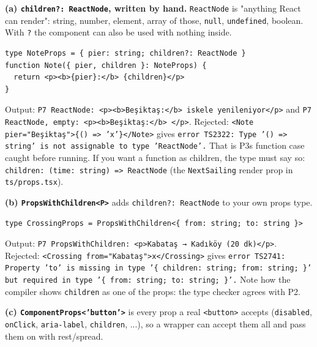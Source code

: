 \documentclass[
  10pt,
]{article}
\begin{document}
\textbf{(a) \texttt{children?:\allowbreak{} ReactNode}, written by
hand.} \texttt{ReactNode} is "anything React can render": string,
number, element, array of those, \texttt{null}, \texttt{undefined},
boolean. With \texttt{?} the component can also be used with nothing
inside.

\begin{verbatim}
type NoteProps = { pier: string; children?: ReactNode }
function Note({ pier, children }: NoteProps) {
  return <p><b>{pier}:</b> {children}</p>
}
\end{verbatim}

Output:
\texttt{P7 ReactNode:\allowbreak{} <p><b>Beşiktaş:\allowbreak{}</\allowbreak{}b> iskele yenileniyor</\allowbreak{}p>}
and
\texttt{P7 ReactNode,\allowbreak{} empty:\allowbreak{} <p><b>Beşiktaş:\allowbreak{}</\allowbreak{}b> </\allowbreak{}p>}.
Rejected:
\texttt{<Note pier=\allowbreak{}"Beşiktaş">\{(\allowbreak{}) =\allowbreak{}> 'x'\}</\allowbreak{}Note>}
gives
\texttt{error TS2322:\allowbreak{} Type '(\allowbreak{}) =\allowbreak{}> string' is not assignable to type 'ReactNode'.\allowbreak{}}
That is P3\textquotesingle s function case caught before running. If you
want a function as children, the type must say so:
\texttt{children:\allowbreak{} (\allowbreak{}time:\allowbreak{} string) =\allowbreak{}> ReactNode}
(the \texttt{NextSailing} render prop in
\texttt{ts/\allowbreak{}props.\allowbreak{}tsx}).

\textbf{(b) \texttt{PropsWithChildren<P>}} adds
\texttt{children?:\allowbreak{} ReactNode} to your own props type.

\begin{verbatim}
type CrossingProps = PropsWithChildren<{ from: string; to: string }>
\end{verbatim}

Output:
\texttt{P7 PropsWithChildren:\allowbreak{} <p>Kabataş → Kadıköy (\allowbreak{}20 dk)</\allowbreak{}p>}.
Rejected:
\texttt{<Crossing from=\allowbreak{}"Kabataş">x</\allowbreak{}Crossing>}
gives
\texttt{error TS2741:\allowbreak{} Property 'to' is missing in type '\{ children:\allowbreak{} string; from:\allowbreak{} string; \}' but required in type '\{ from:\allowbreak{} string; to:\allowbreak{} string; \}'.\allowbreak{}}
Note how the compiler shows \texttt{children} as one of the props: the
type checker agrees with P2.

\textbf{(c) \texttt{ComponentProps<'button'>}} is every prop a real
\texttt{<button>} accepts (\texttt{disabled}, \texttt{onClick},
\texttt{aria-label}, \texttt{children}, ...), so a wrapper can accept
them all and pass them on with rest/spread.
\end{document}
